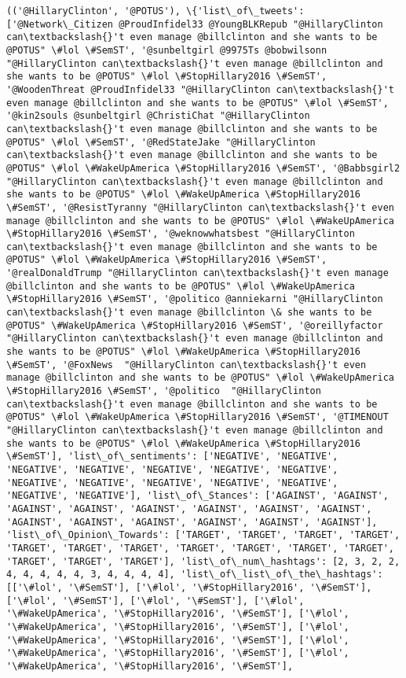 \documentclass[11pt]{article}
\begin{document}
\begin{Verbatim}[commandchars=\\\{\}]
(('@HillaryClinton', '@POTUS'), \{'list\_of\_tweets': ['@Network\_Citizen @ProudInfidel33 @YoungBLKRepub "@HillaryClinton can\textbackslash{}'t even manage @billclinton and she wants to be @POTUS" \#lol \#SemST', '@sunbeltgirl @9975Ts @bobwilsonn "@HillaryClinton can\textbackslash{}'t even manage @billclinton and she wants to be @POTUS" \#lol \#StopHillary2016 \#SemST', '@WoodenThreat @ProudInfidel33 "@HillaryClinton can\textbackslash{}'t even manage @billclinton and she wants to be @POTUS" \#lol \#SemST', '@kin2souls @sunbeltgirl @ChristiChat "@HillaryClinton can\textbackslash{}'t even manage @billclinton and she wants to be @POTUS" \#lol \#SemST', '@RedStateJake "@HillaryClinton can\textbackslash{}'t even manage @billclinton and she wants to be @POTUS" \#lol \#WakeUpAmerica \#StopHillary2016 \#SemST', '@Babbsgirl2 "@HillaryClinton can\textbackslash{}'t even manage @billclinton and she wants to be @POTUS" \#lol \#WakeUpAmerica \#StopHillary2016 \#SemST', '@ResistTyranny "@HillaryClinton can\textbackslash{}'t even manage @billclinton and she wants to be @POTUS" \#lol \#WakeUpAmerica \#StopHillary2016 \#SemST', '@weknowwhatsbest "@HillaryClinton can\textbackslash{}'t even manage @billclinton and she wants to be @POTUS" \#lol \#WakeUpAmerica \#StopHillary2016 \#SemST', '@realDonaldTrump "@HillaryClinton can\textbackslash{}'t even manage @billclinton and she wants to be @POTUS" \#lol \#WakeUpAmerica \#StopHillary2016 \#SemST', '@politico @anniekarni "@HillaryClinton can\textbackslash{}'t even manage @billclinton \& she wants to be @POTUS" \#WakeUpAmerica \#StopHillary2016 \#SemST', '@oreillyfactor "@HillaryClinton can\textbackslash{}'t even manage @billclinton and she wants to be @POTUS" \#lol \#WakeUpAmerica \#StopHillary2016 \#SemST', '@FoxNews  "@HillaryClinton can\textbackslash{}'t even manage @billclinton and she wants to be @POTUS" \#lol \#WakeUpAmerica \#StopHillary2016 \#SemST', '@politico  "@HillaryClinton can\textbackslash{}'t even manage @billclinton and she wants to be @POTUS" \#lol \#WakeUpAmerica \#StopHillary2016 \#SemST', '@TIMENOUT  "@HillaryClinton can\textbackslash{}'t even manage @billclinton and she wants to be @POTUS" \#lol \#WakeUpAmerica \#StopHillary2016 \#SemST'], 'list\_of\_sentiments': ['NEGATIVE', 'NEGATIVE', 'NEGATIVE', 'NEGATIVE', 'NEGATIVE', 'NEGATIVE', 'NEGATIVE', 'NEGATIVE', 'NEGATIVE', 'NEGATIVE', 'NEGATIVE', 'NEGATIVE', 'NEGATIVE', 'NEGATIVE'], 'list\_of\_Stances': ['AGAINST', 'AGAINST', 'AGAINST', 'AGAINST', 'AGAINST', 'AGAINST', 'AGAINST', 'AGAINST', 'AGAINST', 'AGAINST', 'AGAINST', 'AGAINST', 'AGAINST', 'AGAINST'], 'list\_of\_Opinion\_Towards': ['TARGET', 'TARGET', 'TARGET', 'TARGET', 'TARGET', 'TARGET', 'TARGET', 'TARGET', 'TARGET', 'TARGET', 'TARGET', 'TARGET', 'TARGET', 'TARGET'], 'list\_of\_num\_hashtags': [2, 3, 2, 2, 4, 4, 4, 4, 4, 3, 4, 4, 4, 4], 'list\_of\_list\_of\_the\_hashtags': [['\#lol', '\#SemST'], ['\#lol', '\#StopHillary2016', '\#SemST'], ['\#lol', '\#SemST'], ['\#lol', '\#SemST'], ['\#lol', '\#WakeUpAmerica', '\#StopHillary2016', '\#SemST'], ['\#lol', '\#WakeUpAmerica', '\#StopHillary2016', '\#SemST'], ['\#lol', '\#WakeUpAmerica', '\#StopHillary2016', '\#SemST'], ['\#lol', '\#WakeUpAmerica', '\#StopHillary2016', '\#SemST'], ['\#lol', '\#WakeUpAmerica', '\#StopHillary2016', '\#SemST'], 
\end{Verbatim}
\end{document}
